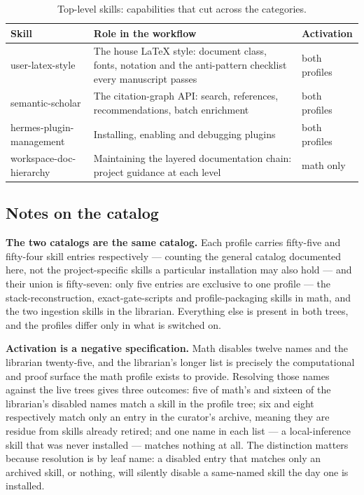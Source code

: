 \documentclass[10pt]{article}
\begin{document}
\begin{table}[htbp]
\centering\footnotesize
\caption{Top-level skills: capabilities that cut across the categories.}\label{tab:skillstop}
\renewcommand{\arraystretch}{1.15}
\begin{tabularx}{\textwidth}{@{}>{\raggedright\arraybackslash}p{3.5cm} X >{\raggedright\arraybackslash}p{2.3cm}@{}}
\toprule
\textbf{Skill} & \textbf{Role in the workflow} & \textbf{Activation} \\
\midrule
user-latex-style & The house LaTeX style: document class, fonts, notation and the anti-pattern checklist every manuscript passes & both profiles \\
semantic-scholar & The citation-graph API: search, references, recommendations, batch enrichment & both profiles \\
hermes-plugin-management & Installing, enabling and debugging plugins & both profiles \\
workspace-doc-hierarchy & Maintaining the layered documentation chain: project guidance at each level & math only \\
\bottomrule
\end{tabularx}
\end{table}

\subsection{Notes on the catalog}

\textbf{The two catalogs are the same catalog.} Each profile carries fifty-five and fifty-four skill
entries respectively --- counting the general catalog documented here, not the project-specific skills
a particular installation may also hold --- and their union is fifty-seven: only five entries are
exclusive to one profile --- the stack-reconstruction, exact-gate-scripts and profile-packaging skills
in math, and the two ingestion skills in the librarian. Everything else is present in both trees, and the profiles differ only in what is
switched on.

\textbf{Activation is a negative specification.} Math disables twelve names and the librarian
twenty-five, and the librarian's longer list is precisely the computational and proof surface the
math profile exists to provide. Resolving those names against the live trees gives three outcomes:
five of math's and sixteen of the librarian's disabled names match a skill in the profile tree; six
and eight respectively match only an entry in the curator's archive, meaning they are residue from
skills already retired; and one name in each list --- a local-inference skill that was never installed
--- matches nothing at all. The distinction matters because resolution is by leaf name: a disabled
entry that matches only an archived skill, or nothing, will silently disable a same-named skill the
day one is installed.
\end{document}
